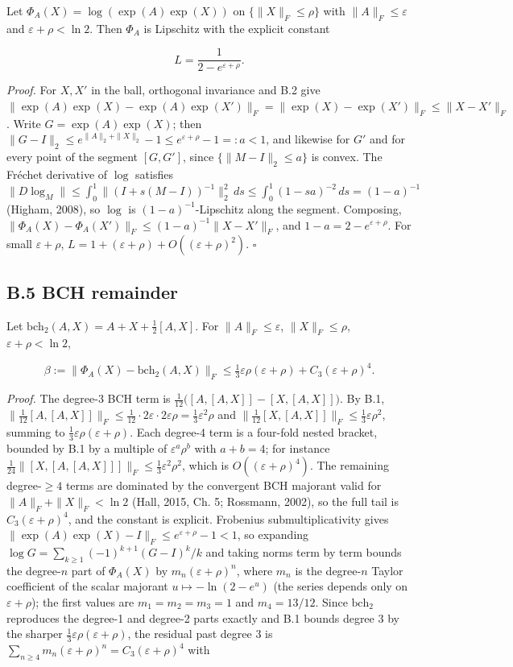 \documentclass[
]{article}
\begin{document}
Let \(\Phi_A(X)=\log(\exp(A)\exp(X))\) on \(\{\|X\|_F\leq\rho\}\) with \(\|A\|_F\leq\varepsilon\) and \(\varepsilon+\rho<\ln 2\). Then \(\Phi_A\) is Lipschitz with the explicit constant

\[
L=\frac{1}{2-e^{\varepsilon+\rho}}.
\]

\emph{Proof.} For \(X,X'\) in the ball, orthogonal invariance and B.2 give \(\|\exp(A)\exp(X)-\exp(A)\exp(X')\|_F=\|\exp(X)-\exp(X')\|_F\leq\|X-X'\|_F\). Write \(G=\exp(A)\exp(X)\); then \(\|G-I\|_2\leq e^{\|A\|_2+\|X\|_2}-1\leq e^{\varepsilon+\rho}-1=:a<1\), and likewise for \(G'\) and for every point of the segment \([G,G']\), since \(\{\|M-I\|_2\leq a\}\) is convex. The Fréchet derivative of \(\log\) satisfies \(\|D\log_M\|\leq\int_0^1\|(I+s(M-I))^{-1}\|_2^2\,ds\leq\int_0^1(1-sa)^{-2}\,ds=(1-a)^{-1}\) (Higham, 2008), so \(\log\) is \((1-a)^{-1}\)-Lipschitz along the segment. Composing, \(\|\Phi_A(X)-\Phi_A(X')\|_F\leq(1-a)^{-1}\|X-X'\|_F\), and \(1-a=2-e^{\varepsilon+\rho}\). For small \(\varepsilon+\rho\), \(L=1+(\varepsilon+\rho)+O((\varepsilon+\rho)^2)\). \(\square\)

\subsection{B.5 BCH remainder}\label{b.5-bch-remainder}

Let \(\mathrm{bch}_2(A,X)=A+X+\tfrac{1}{2}[A,X]\). For \(\|A\|_F\leq\varepsilon\), \(\|X\|_F\leq\rho\), \(\varepsilon+\rho<\ln 2\),

\[
\beta:=\|\Phi_A(X)-\mathrm{bch}_2(A,X)\|_F\leq\tfrac{1}{3}\varepsilon\rho(\varepsilon+\rho)+C_3(\varepsilon+\rho)^4.
\]

\emph{Proof.} The degree-3 BCH term is \(\tfrac{1}{12}\big([A,[A,X]]-[X,[A,X]]\big)\). By B.1, \(\|\tfrac{1}{12}[A,[A,X]]\|_F\leq\tfrac{1}{12}\cdot 2\varepsilon\cdot 2\varepsilon\rho=\tfrac{1}{3}\varepsilon^2\rho\) and \(\|\tfrac{1}{12}[X,[A,X]]\|_F\leq\tfrac{1}{3}\varepsilon\rho^2\), summing to \(\tfrac{1}{3}\varepsilon\rho(\varepsilon+\rho)\). Each degree-4 term is a four-fold nested bracket, bounded by B.1 by a multiple of \(\varepsilon^a\rho^b\) with \(a+b=4\); for instance \(\tfrac{1}{24}\|[X,[A,[A,X]]]\|_F\leq\tfrac{1}{3}\varepsilon^2\rho^2\), which is \(O((\varepsilon+\rho)^4)\). The remaining degree-\(\geq 4\) terms are dominated by the convergent BCH majorant valid for \(\|A\|_F+\|X\|_F<\ln 2\) (Hall, 2015, Ch. 5; Rossmann, 2002), so the full tail is \(C_3(\varepsilon+\rho)^4\), and the constant is explicit. Frobenius submultiplicativity gives \(\|\exp(A)\exp(X)-I\|_F\leq e^{\varepsilon+\rho}-1<1\), so expanding \(\log G=\sum_{k\geq 1}(-1)^{k+1}(G-I)^k/k\) and taking norms term by term bounds the degree-\(n\) part of \(\Phi_A(X)\) by \(m_n(\varepsilon+\rho)^n\), where \(m_n\) is the degree-\(n\) Taylor coefficient of the scalar majorant \(u\mapsto-\ln(2-e^{u})\) (the series depends only on \(\varepsilon+\rho\)); the first values are \(m_1=m_2=m_3=1\) and \(m_4=13/12\). Since \(\mathrm{bch}_2\) reproduces the degree-1 and degree-2 parts exactly and B.1 bounds degree 3 by the sharper \(\tfrac13\varepsilon\rho(\varepsilon+\rho)\), the residual past degree 3 is \(\sum_{n\geq 4}m_n(\varepsilon+\rho)^n=C_3(\varepsilon+\rho)^4\) with
\end{document}
